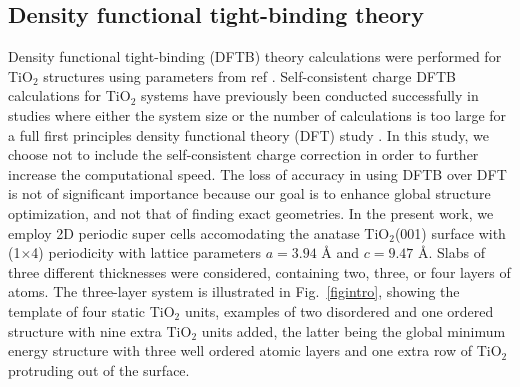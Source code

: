 \documentclass[aip,amsmath,amssymb,reprint]{revtex4-1}
\begin{document}
\subsection{Density functional tight-binding theory}
Density functional tight-binding (DFTB) theory calculations were
performed for TiO$_2$ structures using parameters from ref \cite{dolgonos2010}. Self-consistent charge DFTB calculations for TiO$_2$ systems have previously been conducted
successfully in studies where either the system size or the number of calculations is too large for a full first principles density functional theory (DFT) study \cite{Selli2017a, Selli2017b}. In this study, we choose not to include the self-consistent charge correction in order to further increase the computational speed. The loss of accuracy in using DFTB over DFT is not of significant importance because our goal is to enhance global structure optimization, and not that of finding exact geometries. In the present work, we
employ 2D periodic super cells accomodating the anatase TiO$_2$(001)
surface with (1$\times$4) periodicity with lattice parameters $a=3.94$ {\AA} and $c=9.47$ {\AA}. Slabs of three different
thicknesses were considered, containing two, three, or four layers of
atoms. The three-layer system is illustrated in Fig.\  \ref{figintro},
showing the template of four static TiO$_2$ units, examples of
two disordered and one ordered structure with nine extra TiO$_2$ units added, the latter being the
global minimum energy structure with three well ordered atomic layers
and one extra row of TiO$_2$ protruding out of the surface.
\end{document}
